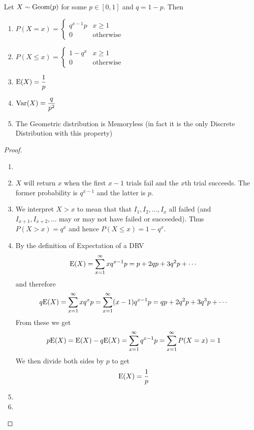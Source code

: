 \documentclass{report}
\begin{document}
    \begin{theorem}
        Let $X\sim \textup{Geom}(p)$ for some $p\in [0,1]$ and $q=1-p$. Then
        \begin{enumerate}
            \item 
            $
                P(X=x)=\begin{cases}
                    q^{x-1}p & x\ge 1 \\
                    0 & \text{otherwise}
                \end{cases}
            $
            \item 
            $
                P(X\le x)=\begin{cases}
                    1-q^x & x\ge 1 \\
                    0 & \text{otherwise}
                \end{cases}
            $
            \item $\textup{E}(X)=\displaystyle\frac 1 p$
            \item $\textup{Var}(X)=\displaystyle \frac q {p^2}$
            \item The Geometric distribution is Memoryless (in fact it is the only Discrete Distribution with this property)
        \end{enumerate}
        \begin{proof}
            \begin{enumerate}
                \item[]
                \item $X$ will return $x$ when the first $x-1$ trials fail and the $x$th trial succeeds. The former probability is $q^{x-1}$ and the latter is $p$.
                \item We interpret $X>x$ to mean that that $I_1,I_2,...,I_x$ all failed (and $I_{x+1}, I_{x+2},...$ may or may not have failed or succeeded). Thus $P(X>x)=q^x$ and hence $P(X\le x)=1-q^x$.
                \item By the definition of Expectation of a DRV
                \[
                    \textup{E}(X)=\sum_{x=1}^\infty xq^{x-1}p=p+2qp+3q^2p+\cdots
                \]
                and therefore
                \[
                    q\textup{E}(X)=\sum_{x=1}^\infty xq^x p=\sum_{x=1}^\infty (x-1)q^{x-1} p =  qp+2q^2p+3q^3p+\cdots
                \]
                From these we get
                \[
                    p\textup{E}(X)=\textup{E}(X)-q\textup{E}(X)=\sum_{x=1}^\infty q^{x-1}p=\sum_{x=1}^\infty P(X=x)=1
                \]
                We then divide both sides by $p$ to get
                \[
                    \textup{E}(X)=\frac 1p
                \]
                \item \todo
                \item \todo
            \end{enumerate}
        \end{proof}
    \end{theorem}
\end{document}
